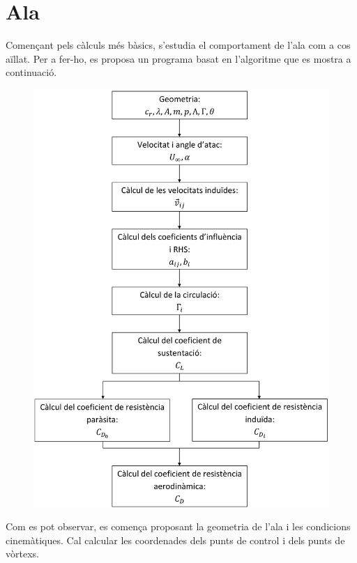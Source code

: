 \chapter{Ala}
Començant pels càlculs més bàsics, s'estudia el comportament de l'ala com a cos aïllat. Per a fer-ho, es proposa un programa basat en l'algoritme que es mostra a continuació.
\begin{figure}[H]
	\centering
	\includegraphics[scale=0.185]{./plots/algoritmewing}
\end{figure}

Com es pot observar, es comença proposant la geometria de l'ala i les condicions cinemàtiques. Cal calcular les coordenades dels punts de control i dels punts de vòrtexs.

